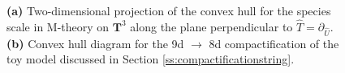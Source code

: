 
\begin{figure}[htb]
\begin{center}
	\label{sfig:2dslice}
    \quad
	\label{sfig:toymodel8d}
	\caption{\small \textbf{(a)} Two-dimensional projection of the convex hull for the species scale in M-theory on $\mathbf{T}^3$ along the plane perpendicular to $\hat T = \partial_{\hat{U}}$. \textbf{(b)} Convex hull diagram for the 9d $\to$ 8d compactification of the toy model discussed in Section \ref{ss:compactificationstring}.}
	\label{fig:ch-comparison-toymodel}	
\end{center}
\end{figure}

